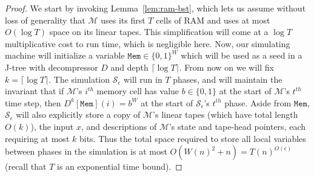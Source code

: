 \documentclass[11pt]{article}
\newcommand{\B}{\{0,1\}}
\begin{document}
\begin{proof}
We start by invoking Lemma~\ref{lem:ram-bst}, which lets us assume without loss of generality that $\mathcal{M}$ uses its first $T$ cells of RAM and uses at most $O(\log T)$ space on its linear tapes. This simplification will come at a $\log T$ multiplicative cost to run time, which is negligible here. Now, our simulating machine will initialize a variable $\mathtt{Mem} \in \B^W$ which will be used as a seed in a J-tree with decompressor $D$ and depth $\lceil \log T \rceil$. From now on we will fix $k = \lceil \log T \rceil$. The simulation $\mathcal{S}_{\epsilon}$ will run in $T$ phases, and will maintain the invariant that if $\mathcal{M}$'s $i^{th}$ memory cell has value $b \in \B$ at the start of $\mathcal{M}$'s $t^{th}$ time step, then $D^k[\mathtt{Mem}](i) = b^W$ at the start of $\mathcal{S}_{\epsilon}$'s $t^{th}$ phase. Aside from $\mathtt{Mem}$, $\mathcal{S}_{\epsilon}$ will also explicitly store a copy of $\mathcal{M}$'s linear tapes (which have total length $O(k)$), the input $x$, and descriptions of $\mathcal{M}$'s state and tape-head pointers, each requiring at most $k$ bits. Thus the total space required to store all local variables between phases in the simulation is at most $O(W(n)^2 + n) = T(n)^{O(\epsilon)}$ (recall that $T$ is an exponential time bound).


\end{proof}
\end{document}
